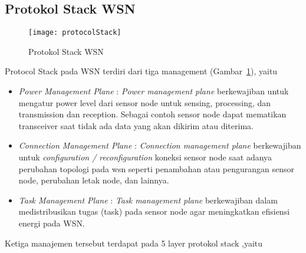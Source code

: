\subsection{Protokol Stack WSN \cite{jun:0:wsnpers}}
\begin{figure} [H]
	\centering  
	\texttt{[image: protocolStack]}  
	\caption[Protokol Stack WSN]{Protokol Stack WSN} 
	\label{fig:protocolStack} 
\end{figure} 

Protocol Stack pada WSN terdiri dari tiga management (Gambar~\ref{fig:protocolStack}), yaitu
\begin{itemize}
\item {\it Power Management Plane} : {\it Power management plane} berkewajiban untuk mengatur power level dari sensor node untuk sensing, processing, dan transmission dan reception. Sebagai contoh sensor node dapat mematikan transceiver saat tidak ada data yang akan dikirim atau diterima. 
\item {\it Connection Management Plane} : {\it Connection management plane} berkewajiban untuk {\it configuration / reconfiguration} koneksi sensor node saat adanya perubahan topologi pada wsn seperti penambahan atau pengurangan sensor node, perubahan letak node, dan lainnya.
\item {\it Task Management Plane} : {\it Task management plane} berkewajiban dalam medistribusikan tugas (task) pada sensor node agar meningkatkan efisiensi energi pada WSN.
\end{itemize}  
Ketiga manajemen tersebut terdapat pada 5 layer protokol stack ,yaitu
